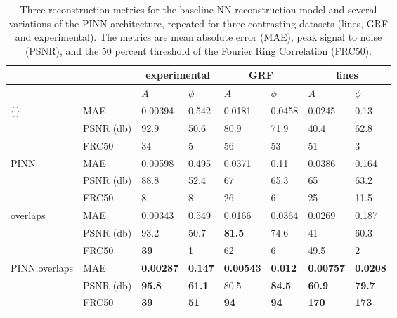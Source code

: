 \documentclass[sn-mathphys]{sn-jnl}%
\theoremstyle{thmstyleone}%
\theoremstyle{thmstyletwo}%
\theoremstyle{thmstylethree}%
\begin{document}
\begin{table}[h]
\begin{center}
\caption{Three reconstruction metrics for the baseline NN reconstruction model and several variations of the PINN architecture, repeated for three contrasting datasets (lines, GRF and experimental). The metrics are mean absolute error (MAE), peak signal to noise (PSNR), and the 50 percent threshold of the Fourier Ring Correlation (FRC50). }\label{tab1}%
\begin{tabular}{p{2cm}l|ll|ll|ll}
\toprule 
    & \multicolumn{1}{c}{} & \multicolumn{2}{c}{experimental} & \multicolumn{2}{c}{GRF} & \multicolumn{2}{c}{lines}\\
    \midrule
    &
    & $A$ & $\phi$
    & $A$ & $\phi$
    & $A$ & $\phi$ \\
    \midrule
$\{\}$\footnotemark[1]    
& MAE & 0.00394 & 0.542 & 0.0181 & 0.0458 & 0.0245 & 0.13 \\
& PSNR (db) & 92.9  & 50.6 & 80.9 & 71.9 & 40.4 & 62.8 \\
& FRC50 & 34 & 5 & 56 & 53 & 51 & 3 \\
    \midrule
$\mathrm{PINN} $
& MAE & 0.00598 & 0.495 & 0.0371 & 0.11 & 0.0386 & 0.164 \\
& PSNR (db) & 88.8  & 52.4 & 67 & 65.3 & 65 & 63.2 \\
& FRC50 & 8 & 8 & 26 & 6 & 25 & 11.5 \\
    \midrule
overlaps
& MAE & 0.00343 & 0.549 & 0.0166 & 0.0364 & 0.0269 & 0.187 \\
& PSNR (db) & 93.2  & 50.7 & \textbf{81.5} & 74.6 & 41 & 60.3 \\
& FRC50 & \textbf{39} & 1 & 62 & 6 & 49.5 & 2 \\
    \midrule
PINN,overlaps\footnotemark[2]    
& MAE & \textbf{0.00287} & \textbf{0.147} & \textbf{0.00543} & \textbf{0.012} & \textbf{0.00757} & \textbf{0.0208} \\
& PSNR (db) & \textbf{95.8}  & \textbf{61.1} & 80.5 & \textbf{84.5} & \textbf{60.9} & \textbf{79.7} \\
& FRC50 & \textbf{39} & \textbf{51} & \textbf{94} & \textbf{94} & \textbf{170} & \textbf{173} \\
\end{tabular}
\end{center}
\end{table}
\end{document}
